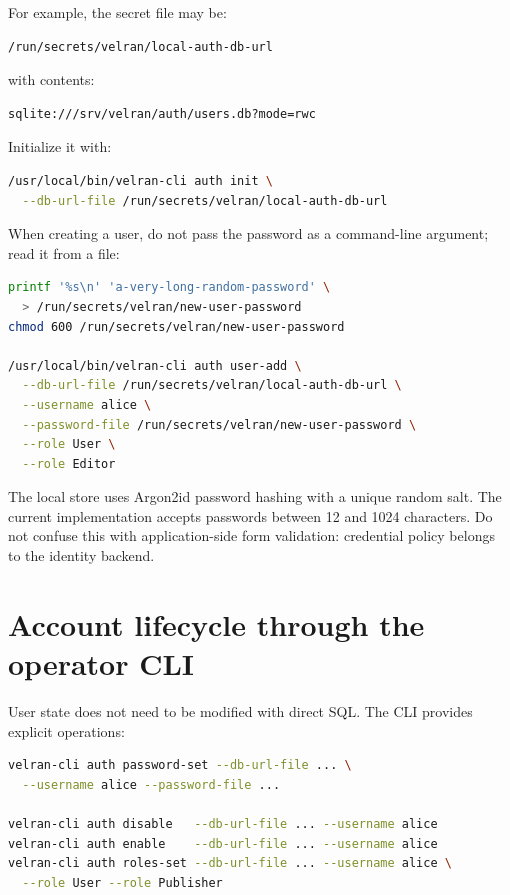 For example, the secret file may be:

\begin{lstlisting}
/run/secrets/velran/local-auth-db-url
\end{lstlisting}

with contents:

\begin{lstlisting}
sqlite:///srv/velran/auth/users.db?mode=rwc
\end{lstlisting}

Initialize it with:

\begin{lstlisting}[language=bash]
/usr/local/bin/velran-cli auth init \
  --db-url-file /run/secrets/velran/local-auth-db-url
\end{lstlisting}

When creating a user, do not pass the password as a command-line argument; read it from a file:

\begin{lstlisting}[language=bash]
printf '%s\n' 'a-very-long-random-password' \
  > /run/secrets/velran/new-user-password
chmod 600 /run/secrets/velran/new-user-password

/usr/local/bin/velran-cli auth user-add \
  --db-url-file /run/secrets/velran/local-auth-db-url \
  --username alice \
  --password-file /run/secrets/velran/new-user-password \
  --role User \
  --role Editor
\end{lstlisting}

The local store uses Argon2id password hashing with a unique random salt. The current implementation accepts passwords between 12 and 1024 characters. Do not confuse this with application-side form validation: credential policy belongs to the identity backend.

\section{Account lifecycle through the operator CLI}

User state does not need to be modified with direct SQL. The CLI provides explicit operations:

\begin{lstlisting}[language=bash]
velran-cli auth password-set --db-url-file ... \
  --username alice --password-file ...

velran-cli auth disable   --db-url-file ... --username alice
velran-cli auth enable    --db-url-file ... --username alice
velran-cli auth roles-set --db-url-file ... --username alice \
  --role User --role Publisher
\end{lstlisting}


